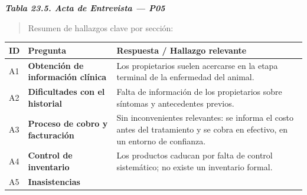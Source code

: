 \documentclass[
]{article}
\newcounter{none} %
\begin{document}
\protect{}\label{_bookmark_P05_acta}{}\emph{\textbf{Tabla 23.5. Acta de Entrevista --- P05}}

\begin{quote}
Resumen de hallazgos clave por sección:
\end{quote}

{\def\LTcaptype{none} %
\begin{longtable}[]{|
  >{\centering\arraybackslash}p{}|
  >{\raggedright\arraybackslash}p{}|
  >{\raggedright\arraybackslash}p{}|}
\hline
\begin{minipage}[b]{\linewidth}\centering
\textbf{ID}
\end{minipage} & \begin{minipage}[b]{\linewidth}\centering
\textbf{Pregunta}
\end{minipage} & \begin{minipage}[b]{\linewidth}\raggedright
\textbf{Respuesta / Hallazgo relevante}
\end{minipage} \\
\hline
\endhead
\hline
\endlastfoot
A1 & \textbf{Obtención de información clínica} &
\begin{minipage}[t]{\linewidth}\raggedright
Los propietarios suelen acercarse en la etapa terminal de la enfermedad del animal.
\end{minipage} \\
\hline
A2 & \textbf{Dificultades con el historial} &
\begin{minipage}[t]{\linewidth}\raggedright
Falta de información de los propietarios sobre síntomas y antecedentes previos.
\end{minipage} \\
\hline
A3 & \textbf{Proceso de cobro y facturación} &
\begin{minipage}[t]{\linewidth}\raggedright
Sin inconvenientes relevantes: se informa el costo antes del tratamiento y se cobra en efectivo, en un entorno de confianza.
\end{minipage} \\
\hline
A4 & \textbf{Control de inventario} &
\begin{minipage}[t]{\linewidth}\raggedright
Los productos caducan por falta de control sistemático; no existe un inventario formal.
\end{minipage} \\
\hline
A5 & \textbf{Inasistencias} &
\begin{minipage}[t]{\linewidth}\raggedright

\end{minipage}
\end{longtable}}
\end{document}
